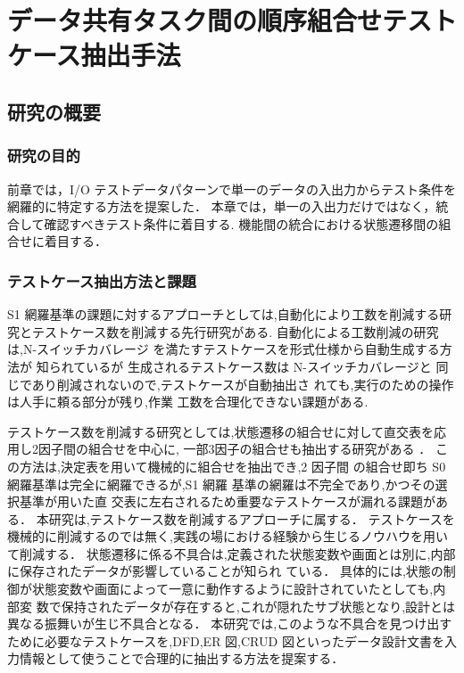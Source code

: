 \documentclass[10pt,a4j]{jarticle}
\begin{document}
\section{データ共有タスク間の順序組合せテストケース抽出手法} \label{chap:5}
\subsection{研究の概要} \label{sec:5-1}
\subsubsection{研究の目的} \label{sec:5-1-1}
前章では，I/O テストデータパターンで単一のデータの入出力からテスト条件を網羅的に特定する方法を提案した．
本章では，単一の入出力だけではなく，統合して確認すべきテスト条件に着目する.
機能間の統合における状態遷移間の組合せに着目する．

\subsubsection{テストケース抽出方法と課題} \label{sec:5-1-2}

S1 網羅基準の課題に対するアプローチとしては,自動化により工数を削減する研究とテストケース数を削減する先行研究がある.
自動化による工数削減の研究は,N-スイッチカバレージ を満たすテストケースを形式仕様から自動生成する方法が 知られているが
生成されるテストケース数は N-スイッチカバレージと 同じであり削減されないので,テストケースが自動抽出さ れても,実行のための操作は人手に頼る部分が残り,作業 工数を合理化できない課題がある.

テストケース数を削減する研究としては,状態遷移の組合せに対して直交表を応用し2因子間の組合せを中心に, 一部3因子の組合せも抽出する研究がある ．
この方法は,決定表を用いて機械的に組合せを抽出でき,2 因子間 の組合せ即ち S0 網羅基準は完全に網羅できるが,S1 網羅 基準の網羅は不完全であり,かつその選択基準が用いた直 交表に左右されるため重要なテストケースが漏れる課題がある．
本研究は,テストケース数を削減するアプローチに属する．
テストケースを機械的に削減するのでは無く,実践の場における経験から生じるノウハウを用いて削減する．
状態遷移に係る不具合は,定義された状態変数や画面とは別に,内部に保存されたデータが影響していることが知られ ている．
具体的には,状態の制御が状態変数や画面によって一意に動作するように設計されていたとしても,内部変 数で保持されたデータが存在すると,これが隠れたサブ状態となり,設計とは異なる振舞いが生じ不具合となる．
本研究では,このような不具合を見つけ出すために必要なテストケースを,DFD,ER 図,CRUD 図といったデータ設計文書を入力情報として使うことで合理的に抽出する方法を提案する．
\end{document}
